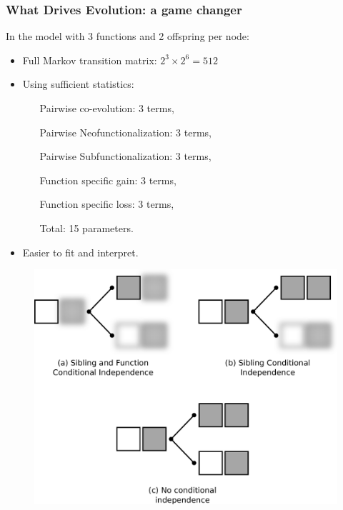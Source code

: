 \documentclass[aspectratio=169, 9pt]{beamer}
\begin{document}
\begin{frame}[c]
	\frametitle{What Drives Evolution: a game changer}
	
	\begin{minipage}[m]{.59\linewidth}
		In the model with 3 functions and 2 offspring per node:\pause
		\begin{itemize}
			\item Full Markov transition matrix: $2^3 \times 2^6 = 512$\pause
			\item Using sufficient statistics:\pause
			\begin{itemize}
				\item[] Pairwise co-evolution: 3 terms,\pause
				\item[]	Pairwise Neofunctionalization: 3 terms,\pause
				\item[] Pairwise Subfunctionalization: 3 terms,\pause
				\item[] Function specific gain: 3 terms,\pause
				\item[] Function specific loss: 3 terms,\pause
				\item[Total:] 15 parameters. \pause
			\end{itemize}
			\item Easier to fit and interpret.
		\end{itemize}
	\end{minipage}\hfill
	\begin{minipage}[m]{.39\linewidth}
		\begin{figure}
			\centering
			\includegraphics[width=.99\linewidth]{phylo-model-overview.pdf}
		\end{figure}
	\end{minipage}
	
\end{frame}
\end{document}
